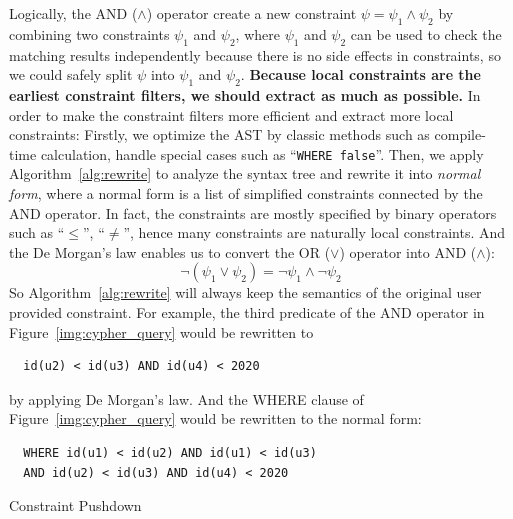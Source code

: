 Logically, the AND ($\land$) operator create a new constraint $\psi = \psi_1 \land \psi_2$ by combining two constraints $\psi_1$ and $\psi_2$,
where $\psi_1$ and $\psi_2$ can be used to check the matching results independently because there is no side effects in constraints,
so we could safely split $\psi$ into $\psi_1$ and $\psi_2$.
\textbf{Because local constraints are the earliest constraint filters, we should extract as much as possible.}
In order to make the constraint filters more efficient and extract more local constraints:
Firstly, we optimize the AST by classic methods such as compile-time calculation,
handle special cases such as ``\texttt{WHERE false}''.
Then, we apply Algorithm~\ref{alg:rewrite} to analyze the syntax tree and rewrite it into \emph{normal form},
where a normal form is a list of simplified constraints connected by the AND operator.
In fact, the constraints are mostly specified by binary operators such as ``$\le$'', ``$\ne$'',
hence many constraints are naturally local constraints.
And the De Morgan's law enables us to convert the OR ($\lor$) operator into AND ($\land$):
\begin{equation}
  \lnot (\psi_1 \lor \psi_2) = \lnot \psi_1 \land \lnot \psi_2
\end{equation}
So Algorithm~\ref{alg:rewrite} will always keep the semantics of the original user provided constraint.
For example, the third predicate of the AND operator in Figure~\ref{img:cypher_query} would be rewritten to
\begin{verbatim}
  id(u2) < id(u3) AND id(u4) < 2020
\end{verbatim}
by applying De Morgan's law.
And the WHERE clause of Figure~\ref{img:cypher_query} would be rewritten to the normal form:
\begin{verbatim}
  WHERE id(u1) < id(u2) AND id(u1) < id(u3)
  AND id(u2) < id(u3) AND id(u4) < 2020
\end{verbatim}

\begin{algorithm}[ht]
  \caption{Constraint Pushdown}\label{alg:push_down}
\end{algorithm}

